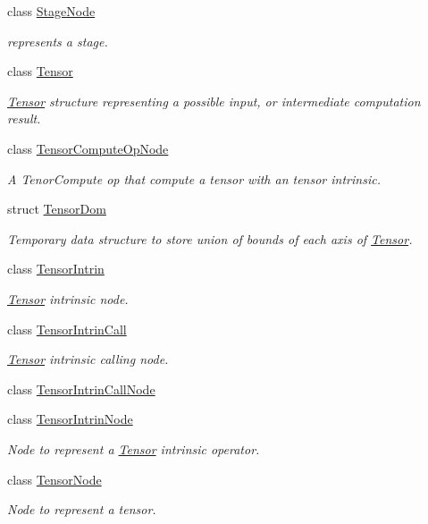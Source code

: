 \begin{DoxyCompactItemize}
class \hyperlink{classtvm_1_1te_1_1StageNode}{Stage\+Node}
\begin{DoxyCompactList}\small\item\em represents a stage. \end{DoxyCompactList}\item 
class \hyperlink{classtvm_1_1te_1_1Tensor}{Tensor}
\begin{DoxyCompactList}\small\item\em \hyperlink{classtvm_1_1te_1_1Tensor}{Tensor} structure representing a possible input, or intermediate computation result. \end{DoxyCompactList}\item 
class \hyperlink{classtvm_1_1te_1_1TensorComputeOpNode}{Tensor\+Compute\+Op\+Node}
\begin{DoxyCompactList}\small\item\em A Tenor\+Compute op that compute a tensor with an tensor intrinsic. \end{DoxyCompactList}\item 
struct \hyperlink{structtvm_1_1te_1_1TensorDom}{Tensor\+Dom}
\begin{DoxyCompactList}\small\item\em Temporary data structure to store union of bounds of each axis of \hyperlink{classtvm_1_1te_1_1Tensor}{Tensor}. \end{DoxyCompactList}\item 
class \hyperlink{classtvm_1_1te_1_1TensorIntrin}{Tensor\+Intrin}
\begin{DoxyCompactList}\small\item\em \hyperlink{classtvm_1_1te_1_1Tensor}{Tensor} intrinsic node. \end{DoxyCompactList}\item 
class \hyperlink{classtvm_1_1te_1_1TensorIntrinCall}{Tensor\+Intrin\+Call}
\begin{DoxyCompactList}\small\item\em \hyperlink{classtvm_1_1te_1_1Tensor}{Tensor} intrinsic calling node. \end{DoxyCompactList}\item 
class \hyperlink{classtvm_1_1te_1_1TensorIntrinCallNode}{Tensor\+Intrin\+Call\+Node}
\item 
class \hyperlink{classtvm_1_1te_1_1TensorIntrinNode}{Tensor\+Intrin\+Node}
\begin{DoxyCompactList}\small\item\em Node to represent a \hyperlink{classtvm_1_1te_1_1Tensor}{Tensor} intrinsic operator. \end{DoxyCompactList}\item 
class \hyperlink{classtvm_1_1te_1_1TensorNode}{Tensor\+Node}
\begin{DoxyCompactList}\small\item\em Node to represent a tensor. \end{DoxyCompactList}\end{DoxyCompactItemize}
